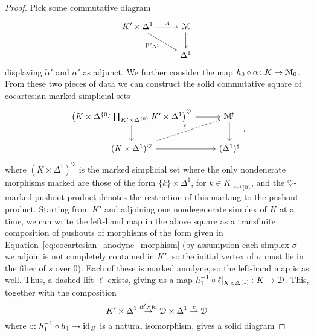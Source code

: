 \documentclass[main.tex]{subfiles}
\begin{document}
\begin{proof}
  Pick some commutative diagram
  \begin{equation*}
    \begin{tikzcd}
      K' \times \Delta^{1}
      \arrow[r, "A"]
      \arrow[dr, swap, "\pr_{\Delta^{1}}"]
      & \category{M}
      \arrow[d]
      \\
      & \Delta^{1}
    \end{tikzcd}
  \end{equation*}
  displaying $\tilde{\alpha}'$ and $\alpha'$ as adjunct. We further consider the map $h_{0} \circ \alpha\colon K \to \mathcal{M}_{0}$. From these two pieces of data we can construct the solid commutative square of cocartesian-marked simplicial sets
  \begin{equation*}
    \begin{tikzcd}
      \left(K \times \Delta^{\{0\}} \coprod_{K' \times \Delta^{\{0\}}} K' \times \Delta^{1}\right)^{\heartsuit}
      \arrow[r]
      \arrow[d]
      & \category{M}^{\natural}
      \arrow[d]
      \\
      (K \times \Delta^{1})^{\heartsuit}
      \arrow[ur, dashed, "\ell"]
      \arrow[r]
      & (\Delta^{1})^{\sharp}
    \end{tikzcd},
  \end{equation*}
  where $(K \times \Delta^{1})^{\heartsuit}$ is the marked simplicial set where the only nondenerate morphisms marked are those of the form $\{k\} \times \Delta^{1}$, for $k \in K|_{s^{-1}\{0\}}$, and the $\heartsuit$-marked pushout-product denotes the restriction of this marking to the pushout-product. Starting from $K'$ and adjoining one nondegenerate simplex of $K$ at a time, we can write the left-hand map in the above square as a transfinite composition of pushouts of morphisms of the form given in \hyperref[eq:cocartesian_anodyne_morphism]{Equation~\ref*{eq:cocartesian_anodyne_morphism}} (by assumption each simplex $\sigma$ we adjoin is not completely contained in $K'$, so the initial vertex of $\sigma$ must lie in the fiber of $s$ over $0$). Each of these is marked anodyne, so the left-hand map is as well. Thus, a dashed lift $\ell$ exists, giving us a map $h_{1}^{-1} \circ \ell|_{K \times \Delta^{\{1\}}}\colon K \to \mathcal{D}$. This, together with the composition
  \begin{equation*}
    K' \times \Delta^{1} \overset{\tilde{\alpha}' \times \mathrm{id}}{\to} \mathcal{D} \times \Delta^{1} \overset{c}{\to} \mathcal{D}
  \end{equation*}
  where $c\colon h_{1}^{-1} \circ h_{1} \to \mathrm{id}_{\mathcal{D}}$ is a natural isomorphism, gives a solid diagram

\end{proof}
\end{document}
